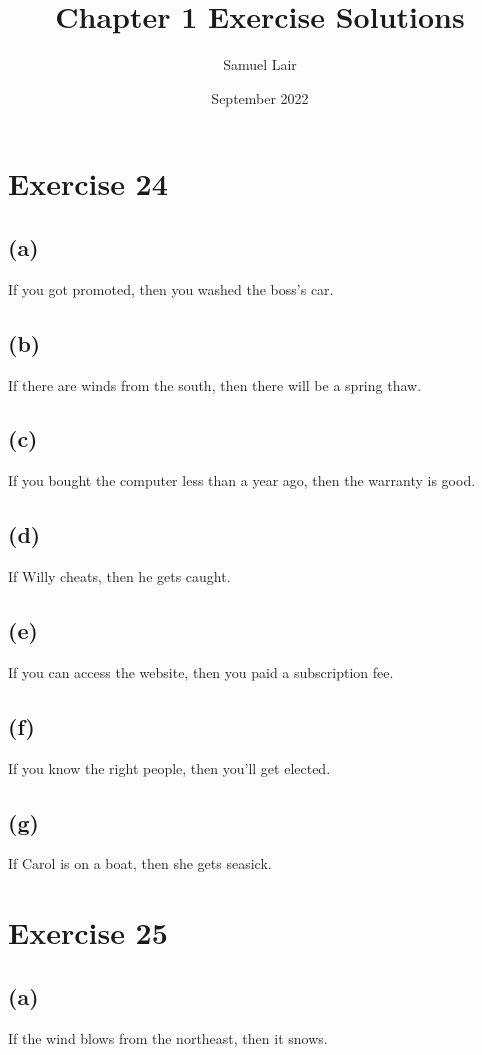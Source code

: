 \documentclass{article}
\title{Chapter 1 Exercise Solutions}
\author{Samuel Lair}
\date{September 2022}
\begin{document}
\maketitle
\tableofcontents

\pagebreak

\section{Exercise 24}
\subsection{(a)}
If you got promoted, then you washed the boss's car.
\subsection{(b)}
If there are winds from the south, then there will be a spring thaw.
\subsection{(c)}
If you bought the computer less than a year ago, then the warranty is good.
\subsection{(d)}
If Willy cheats, then he gets caught.
\subsection{(e)}
If you can access the website, then you paid a subscription fee.
\subsection{(f)}
If you know the right people, then you'll get elected.
\subsection{(g)}
If Carol is on a boat, then she gets seasick.

\pagebreak

\section{Exercise 25}
\subsection{(a)}
If the wind blows from the northeast, then it snows.
\end{document}
